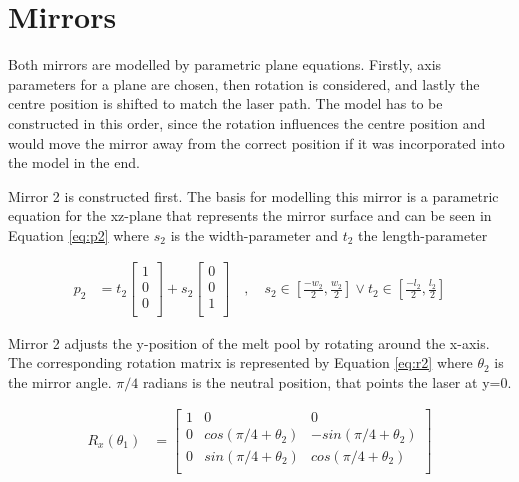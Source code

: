 \section{Mirrors}

Both mirrors are modelled by parametric plane equations. Firstly, axis parameters for a plane are chosen, then rotation is considered, and lastly the centre position is shifted to match the laser path. The model has to be constructed in this order, since the rotation influences the centre position and would move the mirror away from the correct position if it was incorporated into the model in the end.

Mirror 2 is constructed first. The basis for modelling this mirror is a parametric equation for the xz-plane that represents the mirror surface and can be seen in Equation \ref{eq:p2} where $s_2$ is the width-parameter and $t_2$ the length-parameter

\begin{align}
    p_{2} &=
    t_2
    \begin{bmatrix}
        1 \\
        0 \\
        0 \\
    \end{bmatrix}
    +
    s_2
    \begin{bmatrix}
        0 \\
        0 \\
        1 \\
    \end{bmatrix}
    \quad , \quad
    s_2 \in \left[\frac{-w_{2}}{2}, \frac{w_{2}}{2}\right] \vee 
    t_2 \in \left[\frac{-l_{2}}{2}, \frac{l_{2}}{2}\right]
    \label{eq:p2}
\end{align}

Mirror 2 adjusts the y-position of the melt pool by rotating around the x-axis. The corresponding rotation matrix is represented by Equation \ref{eq:r2} where $\theta_2$ is the mirror angle. $\pi/4$ radians is the neutral position, that points the laser at y=0.

\begin{align}
    R_{x}(\theta_1) &=
    \begin{bmatrix}
        1           & 0             & 0             \\
        0           & cos(\pi/4 + \theta_2)   & -sin(\pi/4 + \theta_2)  \\
        0           & sin(\pi/4 + \theta_2)   & cos(\pi/4 + \theta_2)   \\
    \end{bmatrix}
    \label{eq:r2}
\end{align}

